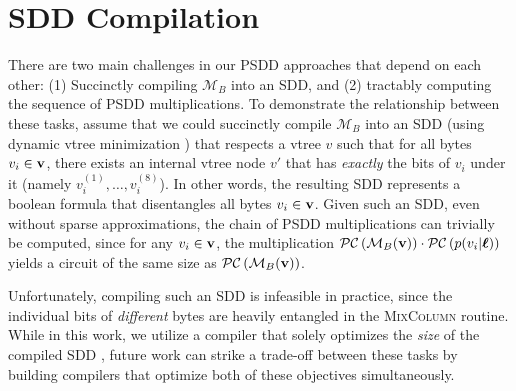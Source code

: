 \section{SDD Compilation}
\label{sec:sdd_comp_discussion}
There are two main challenges in our PSDD approaches that depend on each other: (1) Succinctly compiling $\mathcal{M}_B$ into an SDD, and (2) tractably computing the sequence of PSDD multiplications. To demonstrate the relationship between these tasks, assume that we could succinctly compile $\mathcal{M}_B$ into an SDD (using dynamic vtree minimization \cite{dynamic_min_choi}) that respects a vtree $v$ such that for all bytes $v_i \in \mathbf{v}$, there exists an internal vtree node $v'$ that has \emph{exactly} the bits of $v_i$ under it (namely $v_i^{(1)},\dots,v_i^{(8)}$). In other words, the resulting SDD represents a boolean formula that disentangles all bytes $v_i \in \mathbf{v}$. Given such an SDD, even without sparse approximations, the chain of PSDD multiplications can trivially be computed, since for any $v_i \in \mathbf{v}$, the multiplication $\mathcal{PC} \left( \mathcal{M}_B(\mathbf{v}) \right) \cdot \mathcal{PC}\left( p(v_i | \boldsymbol{\ell}) \right)$ yields a circuit of the same size as $\mathcal{PC} \left( \mathcal{M}_B(\mathbf{v}) \right)$.

Unfortunately, compiling such an SDD is infeasible in practice, since the individual bits of \emph{different} bytes are heavily entangled in the \textsc{MixColumn} routine. While in this work, we utilize a compiler that solely optimizes the \emph{size} of the compiled SDD \cite{dynamic_min_choi}, future work can strike a trade-off between these tasks by building compilers that optimize both of these objectives simultaneously.%



